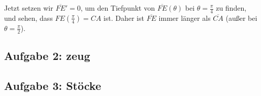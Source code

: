 \documentclass[a4paper,11pt]{article}
\begin{document}
Jetzt setzen wir $\overline{FE}' = 0$, um den Tiefpunkt von $\overline{FE}(\theta)$ bei $\theta = \frac{\pi}{4}$ zu finden, und sehen, dass $FE(\frac{\pi}{4}) = CA$ ist. Daher ist $\overline{FE}$ immer länger als $\overline{CA}$ (au\ss er bei $\theta=\frac{\pi}{2}$).

\subsection{Aufgabe 2: zeug}

\subsection{Aufgabe 3: St\"ocke}
\end{document}
